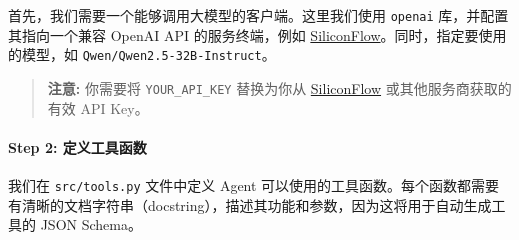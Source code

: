 \documentclass[12pt,a4paper]{book}
\begin{document}
首先，我们需要一个能够调用大模型的客户端。这里我们使用 \texttt{openai}
库，并配置其指向一个兼容 OpenAI API 的服务终端，例如
\href{https://cloud.siliconflow.cn/i/ybUFvmqK}{SiliconFlow}。同时，指定要使用的模型，如
\texttt{Qwen/Qwen2.5-32B-Instruct}。

\begin{Shaded}
\begin{Highlighting}[]

\OperatorTok{=}
\OperatorTok{=}\NormalTok{,  }
\OperatorTok{=}\NormalTok{, }
\NormalTok{)}

\OperatorTok{=} 
\end{Highlighting}
\end{Shaded}

\begin{quote}
\textbf{注意:} 你需要将 \texttt{YOUR\_API\_KEY} 替换为你从
\href{https://cloud.siliconflow.cn/i/ybUFvmqK}{SiliconFlow}
或其他服务商获取的有效 API Key。
\end{quote}

\paragraph{Step 2:
定义工具函数}\label{step-2-ux5b9aux4e49ux5de5ux5177ux51fdux6570}

我们在 \texttt{src/tools.py} 文件中定义 Agent
可以使用的工具函数。每个函数都需要有清晰的文档字符串（docstring），描述其功能和参数，因为这将用于自动生成工具的
JSON Schema。
\end{document}
